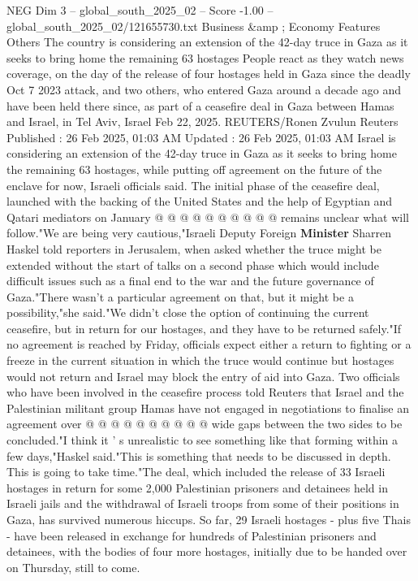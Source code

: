 \begin{textsample}{NEG Dim 3 – global\_south\_2025\_02 – Score -1.00 – global\_south\_2025\_02/121655730.txt}  \label{ex:f3_neg_002}
Business \&amp ; Economy Features Others The country is considering an extension of the 42-day truce in Gaza as it seeks to bring home the remaining 63 hostages People react as they watch news coverage, on the day of the release of four hostages held in Gaza since the deadly Oct 7 2023 attack, and two others, who entered Gaza around a decade ago and have been held there since, as part of a ceasefire deal in Gaza between Hamas and Israel, in Tel Aviv, Israel Feb 22, 2025.
REUTERS/Ronen Zvulun Reuters Published : 26 Feb 2025, 01:03 AM Updated : 26 Feb 2025, 01:03 AM Israel is considering an extension of the 42-day truce in Gaza as it seeks to bring home the remaining 63 hostages, while putting off agreement on the future of the enclave for now, Israeli officials said.
The initial phase of the ceasefire deal, launched with the backing of the United States and the help of Egyptian and Qatari mediators on January @ @ @ @ @ @ @ @ @ @ remains unclear what will follow."We are being very cautious,"Israeli Deputy Foreign \textbf{Minister} Sharren Haskel told reporters in Jerusalem, when asked whether the truce might be extended without the start of talks on a second phase which would include difficult issues such as a final end to the war and the future governance of Gaza."There wasn't a particular agreement on that, but it might be a possibility,"she said."We didn't close the option of continuing the current ceasefire, but in return for our hostages, and they have to be returned safely."If no agreement is reached by Friday, officials expect either a return to fighting or a freeze in the current situation in which the truce would continue but hostages would not return and Israel may block the entry of aid into Gaza.
Two officials who have been involved in the ceasefire process told Reuters that Israel and the Palestinian militant group Hamas have not engaged in negotiations to finalise an agreement over @ @ @ @ @ @ @ @ @ @ wide gaps between the two sides to be concluded."I think it ' s unrealistic to see something like that forming within a few days,"Haskel said."This is something that needs to be discussed in depth.
This is going to take time."The deal, which included the release of 33 Israeli hostages in return for some 2,000 Palestinian prisoners and detainees held in Israeli jails and the withdrawal of Israeli troops from some of their positions in Gaza, has survived numerous hiccups.
So far, 29 Israeli hostages - plus five Thais - have been released in exchange for hundreds of Palestinian prisoners and detainees, with the bodies of four more hostages, initially due to be handed over on Thursday, still to come.

\end{textsample}

